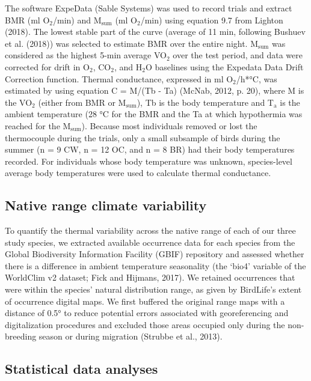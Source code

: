\documentclass[10pt, twoside]{book} %
\begin{document}
The software ExpeData (Sable Systems) was used to record trials and extract BMR (ml O$_{\text{2}}$/min) and M$_{\text{sum}}$ (ml O$_{\text{2}}$/min) using equation 9.7 from Lighton (2018). The lowest stable part of the curve (average of 11 min, following Bushuev et al. (2018)) was selected to estimate BMR over the entire night. M$_{\text{sum}}$ was considered as the highest 5-min average VO$_{\text{2}}$ over the test period, and data were corrected for drift in O$_{\text{2}}$, CO$_{\text{2}}$, and H$_{\text{2}}$O baselines using the Expedata Data Drift Correction function. Thermal conductance, expressed in ml O$_{\text{2}}$/h*°C, was estimated by using equation C = M/(Tb - Ta) (McNab, 2012, p. 20), where M is the VO$_{\text{2}}$ (either from BMR or M$_{\text{sum}}$), Tb is the body temperature and T$_{\text{a}}$ is the ambient temperature (28 °C for the BMR and the Ta at which hypothermia was reached for the M$_{\text{sum}}$). Because most individuals removed or lost the thermocouple during the trials, only a small subsample of birds during the summer (n = 9 CW, n = 12 OC, and n = 8 BR) had their body temperatures recorded. For individuals whose body temperature was unknown, species-level average body temperatures were used to calculate thermal conductance.\\

\subsection{Native range climate variability}

To quantify the thermal variability across the native range of each of our three study species, we extracted available occurrence data for each species from the Global Biodiversity Information Facility (GBIF) repository and assessed whether there is a difference in ambient temperature seasonality (the ‘bio4’ variable of the WorldClim v2 dataset; Fick and Hijmans, 2017). We retained occurrences that were within the species' natural distribution range, as given by BirdLife's extent of occurrence digital maps. We first buffered the original range maps with a distance of 0.5° to reduce potential errors associated with georeferencing and digitalization procedures and excluded those areas occupied only during the non-breeding season or during migration (Strubbe et al., 2013).\\

\subsection{Statistical data analyses}
\end{document}
